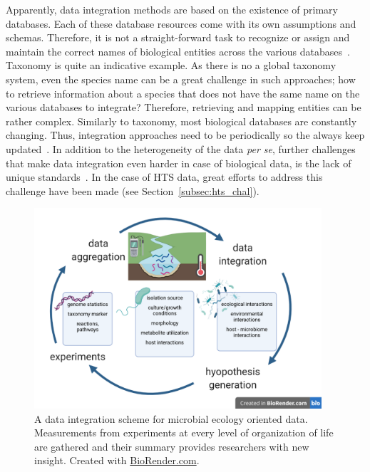       Apparently, data integration methods are based on the existence of primary databases. 
      Each of these database resources come with its own assumptions and schemas. 
      Therefore, it is not a straight-forward task to recognize or assign and maintain 
      the correct names of biological entities across the various databases~\citep{stein2003integrating}.
      Taxonomy is quite an indicative example. 
      As there is no a global taxonomy system, even the species name can be a 
      great challenge in such approaches; how to retrieve information about a species
      that does not have the same name on the various databases to integrate? 
      Therefore, retrieving and mapping entities can be rather complex.  
      Similarly to taxonomy, most biological databases are constantly changing. 
      Thus, integration approaches need to be periodically so the always keep updated~\citep{stein2003integrating}.
      In addition to the heterogeneity of the data \textit{per se},
      further challenges that make data integration even harder in case of biological data,
      is the lack of unique standards~\citep{triplet2011systems}.
      In the case of HTS data, great efforts to address this challenge have been 
      made (see Section~\ref{subsec:hts_chal}).

      \begin{figure}[!h]
         \centering
         \includegraphics[width=0.95\textwidth]{figures/data_integration_scheme.png}
         \caption[Data integration in Microbial Ecology]{A data integration scheme for microbial ecology oriented data. 
         Measurements from experiments at every level of organization of life are gathered and their summary provides researchers with new insight. Created with \href{BioRender.com}{BioRender.com}.
         }
         \label{fig:data_int}
      \end{figure}


